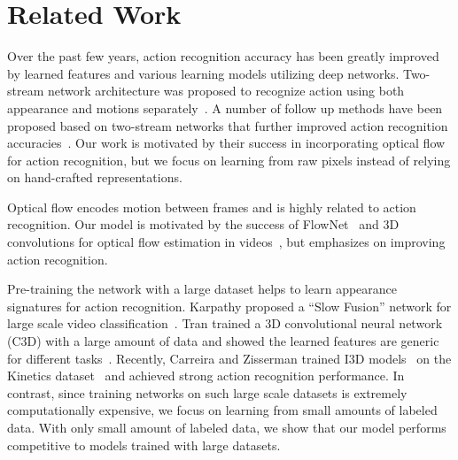 \documentclass[10pt,twocolumn,letterpaper]{article}
\begin{document}
\section{Related Work}
\label{sec:related}
Over the past few years, action recognition accuracy has been greatly improved by learned features and various learning models utilizing deep networks.
Two-stream network architecture was proposed to recognize action using both appearance and motions separately~\cite{simonyanZ14a}.
A number of follow up methods have been proposed based on two-stream networks that further improved action recognition accuracies~\cite{feichtenhofer2016convolutional,wang2016actions,wangXWQLTV16,feichtenhofer2016spatiotemporal,ng2018tdn}.
Our work is motivated by their success in incorporating optical flow for action recognition, but we focus on learning from raw pixels instead of relying on hand-crafted representations.



Optical flow encodes motion between frames and is highly related to action recognition.
Our model is motivated by the success of FlowNet~\cite{FischerDIHHGSCB15} and 3D convolutions for optical flow estimation in videos~\cite{tranbftp16}, but emphasizes on improving action recognition.

Pre-training the network with a large dataset helps to learn appearance signatures for action recognition.
Karpathy \etal proposed a ``Slow Fusion'' network for large scale video classification~\cite{karpathyTSLSF14}.
Tran \etal trained a 3D convolutional neural network (C3D) with a large amount of data and showed the learned features are generic for different tasks~\cite{tranBFTP15}.
Recently, Carreira and Zisserman trained I3D models~\cite{carreira2017quo} on the Kinetics dataset~\cite{kay2017kinetics} and achieved strong action recognition performance.
In contrast, since training networks on such large scale datasets is extremely computationally expensive, we focus on learning from small amounts of labeled data.
With only small amount of labeled data, we show that our model performs competitive to models trained with large datasets.
\end{document}
